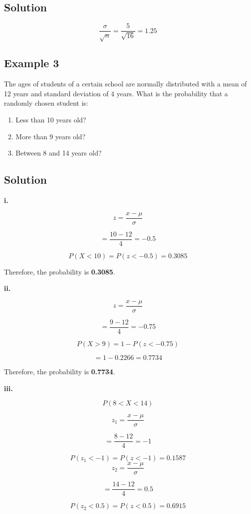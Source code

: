\subsection*{Solution}
\[
\frac{\sigma}{\sqrt{n}} = \frac{5}{\sqrt{16}} = 1.25
\]

\subsection*{Example 3}

The ages of students of a certain school are normally distributed with a mean of 12 years and standard deviation of 4 years. What is the probability that a randomly chosen student is:

\begin{enumerate}
    \item Less than 10 years old?
    \item More than 9 years old?
    \item Between 8 and 14 years old?
\end{enumerate}

\subsection*{Solution}
\textbf{i.}

\[
z = \frac{x - \mu}{\sigma}
\]

\[
= \frac{10 - 12}{4} = -0.5
\]

\[
P(X < 10) = P(z < -0.5) = 0.3085
\]

Therefore, the probability is \textbf{0.3085}.

\textbf{ii.}

\[
z = \frac{x - \mu}{\sigma}
\]

\[
= \frac{9 - 12}{4} = -0.75
\]

\[
P(X > 9) = 1 - P(z < -0.75)
\]

\[
= 1 - 0.2266 = 0.7734
\]

Therefore, the probability is \textbf{0.7734}.

\textbf{iii.}

\[
P(8 < X < 14)
\]

\[
z_1 = \frac{x - \mu}{\sigma}
\]

\[
= \frac{8 - 12}{4} = -1
\]

\[
P(z_1 < -1) = P(z < -1) = 0.1587
\]
\[
z_2 = \frac{x - \mu}{\sigma}
\]

\[
= \frac{14 - 12}{4} = 0.5
\]

\[
P(z_2 < 0.5) = P(z < 0.5) = 0.6915
\]

